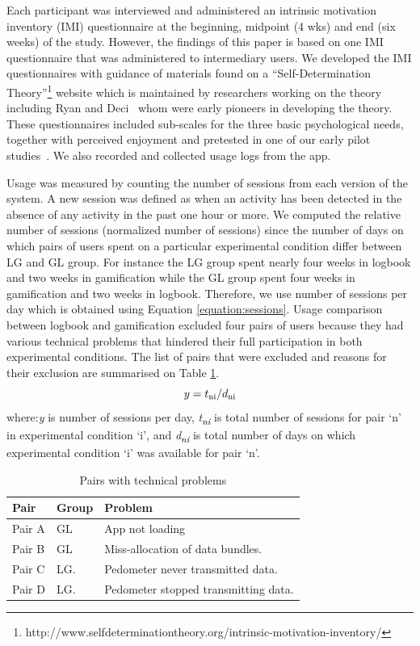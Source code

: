 \documentclass{sig-alternate}
\def\SB#1{\textsubscript{\textcolor{black}{#1}}}
\begin{document}
Each participant was interviewed and administered an intrinsic motivation inventory (IMI) questionnaire at the beginning, midpoint (4 wks) and end (six weeks) of the study. However, the findings of this paper is based on one IMI questionnaire that was administered to intermediary users. We developed the IMI questionnaires with guidance of materials found on a ``Self-Determination Theory''\footnote{http://www.selfdeterminationtheory.org/intrinsic-motivation-inventory/} website which is maintained by researchers working on the theory including  Ryan and Deci~\cite{deci1985:intrinsic} whom were early pioneers in developing the theory. These questionnaires included sub-scales for the three basic psychological needs, together with perceived enjoyment and pretested in one of our early pilot studies~\cite{katule2016:leveraging}.  We also recorded and collected usage logs from the app.

Usage was measured by counting the number of sessions from each version of the system. A new session was defined as when an activity has been detected in the absence of any activity in the past one hour or more. We computed the relative number of sessions (normalized number of sessions) since the number of days on which pairs of users spent on a particular experimental condition differ between LG and GL group. For instance the LG group spent nearly four weeks in logbook and two weeks in gamification while the GL group spent four weeks in gamification and two weeks in logbook. Therefore, we use number of sessions per day which is obtained using Equation \ref{equation:sessions}. Usage comparison between logbook and gamification excluded four pairs of users because they had various technical problems that hindered their full participation in both experimental conditions. The list of pairs that were excluded and reasons for their exclusion are summarised on Table \ref{table:usageproblems}.
\begin{equation}
\label{equation:sessions}
y=t\SB{ni}/d\SB{ni}
\end{equation}
where:\emph{y} is number of sessions per day, \emph{t\SB{ni}} is total number of sessions for pair `n' in experimental condition `i', and \emph{d\SB{ni}} is total number of days on which experimental condition `i' was available for pair `n'.
\begin{table}%
  \begin{center}
    \caption{Pairs with technical problems}
    \label{table:usageproblems}
	\begin{tabular}{|p{0.95cm}|p{0.75cm}|p{5.4cm}|}
		\hline
		Pair&Group&Problem\\
		\hline
		Pair A&GL &App not loading\\
		\hline
		Pair B&GL& Miss-allocation of data bundles.\\
		\hline
		Pair C & LG.& Pedometer never transmitted data.\\
		\hline
		Pair D & LG.& Pedometer stopped transmitting data.\\
	\hline
	\end{tabular}
  \end{center}
\end{table}
\end{document}
